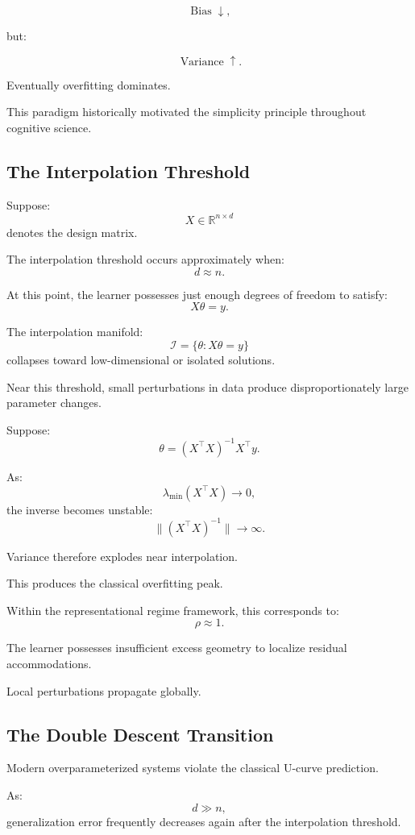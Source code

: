 \documentclass[12pt,a4paper]{article}
\begin{document}
\[
\operatorname{Bias}
\downarrow,
\]

but:

\[
\operatorname{Variance}
\uparrow.
\]

Eventually overfitting dominates.

This paradigm historically motivated the simplicity principle throughout cognitive science.

\subsection{The Interpolation Threshold}

Suppose:
\[
X
\in
\mathbb{R}^{n\times d}
\]
denotes the design matrix.

The interpolation threshold occurs approximately when:
\[
d
\approx
n.
\]

At this point, the learner possesses just enough degrees of freedom to satisfy:
\[
X\theta
=
y.
\]

The interpolation manifold:
\[
\mathcal{I}
=
\{
\theta
:
X\theta=y
\}
\]
collapses toward low-dimensional or isolated solutions.

Near this threshold, small perturbations in data produce disproportionately large parameter changes.

Suppose:
\[
\theta
=
(X^\top X)^{-1}X^\top y.
\]

As:
\[
\lambda_{\min}(X^\top X)
\rightarrow
0,
\]
the inverse becomes unstable:
\[
\|(X^\top X)^{-1}\|
\rightarrow
\infty.
\]

Variance therefore explodes near interpolation.

This produces the classical overfitting peak.

Within the representational regime framework, this corresponds to:
\[
\rho
\approx
1.
\]

The learner possesses insufficient excess geometry to localize residual accommodations.

Local perturbations propagate globally.

\subsection{The Double Descent Transition}

Modern overparameterized systems violate the classical U-curve prediction.

As:
\[
d
\gg
n,
\]
generalization error frequently decreases again after the interpolation threshold.
\end{document}

